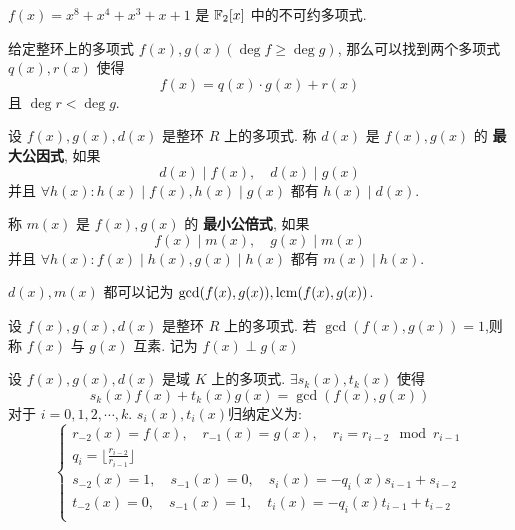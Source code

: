 \begin{example}
    \(f(x) = x^8 + x^4 + x^3 + x + 1\) 是 \(\mathbb{F}_2[x]\) 中的不可约多项式.
\end{example}

\begin{definition}[多项式的Euclid除法]
    给定整环上的多项式 \(f(x),g(x) (\deg f \ge \deg g)\),
    那么可以找到两个多项式 \(q(x), r(x)\) 使得
    \[f(x) = q(x) \cdot g(x) + r(x)\]
    且 \(\deg r < \deg g\).
\end{definition}

\begin{definition}
    设 \(f(x),g(x),d(x)\) 是整环 \(R\) 上的多项式. 称 \(d(x)\) 是
    \(f(x),g(x)\) 的 \textbf{最大公因式}, 如果
    \[d(x) \mid f(x), \quad d(x) \mid g(x)\]
    并且 \(\forall h(x) : h(x) \mid f(x), h(x) \mid g(x)\) 都有 \(h(x) \mid d(x)\).

    称 \(m(x)\) 是 \(f(x),g(x)\) 的 \textbf{最小公倍式}, 如果
    \[f(x) \mid m(x), \quad g(x) \mid m(x)\]
    并且 \(\forall h(x) : f(x) \mid h(x), g(x) \mid h(x)\) 都有 \(m(x) \mid h(x)\).

    \(d(x),m(x)\) 都可以记为 \(\gcd(f(x),g(x)),\mathrm{lcm}(f(x),g(x))\).
\end{definition}

\begin{definition}[多项式互素]
    设 \(f(x),g(x),d(x)\) 是整环 \(R\) 上的多项式.
    若 \(\gcd(f(x), g(x)) = 1\),则称 \(f(x)\) 与 \(g(x)\) 互素.
    记为 \(f(x) \perp g(x)\)
\end{definition}

\begin{theorem}[多项式广义Euclid除法]
    设 \(f(x),g(x),d(x)\) 是域 \(K\) 上的多项式.
    \(\exists s_k(x),t_k(x)\) 使得
    \[s_k(x)f(x) + t_k(x)g(x) = \gcd(f(x),g(x))\]
    对于 \(i = 0,1,2,\cdots,k\). \(s_i(x),t_i(x)\)归纳定义为:
    \[\begin{cases}
        r_{-2}(x) = f(x),\quad r_{-1}(x) = g(x),\quad r_{i} = r_{i-2} \mod{r_{i-1}} \\
        q_{i} = \lfloor \frac{r_{i-2}}{r_{i-1}} \rfloor \\
        s_{-2}(x) = 1,\quad s_{-1}(x) = 0,\quad s_{i}(x) = -q_i(x) s_{i-1}+s_{i-2} \\
        t_{-2}(x) = 0,\quad s_{-1}(x) = 1,\quad t_{i}(x) = -q_i(x) t_{i-1}+t_{i-2} \\
    \end{cases}\]
\end{theorem}

